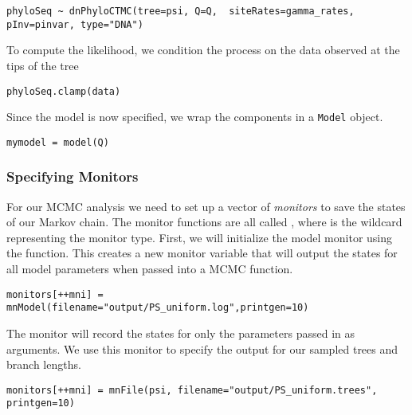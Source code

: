 {\tt \begin{snugshade*}
\begin{lstlisting}
phyloSeq ~ dnPhyloCTMC(tree=psi, Q=Q,  siteRates=gamma_rates, pInv=pinvar, type="DNA")
\end{lstlisting}
\end{snugshade*}}

To compute the likelihood, we condition the process on the data observed at the tips of the tree

{\tt \begin{snugshade*}
\begin{lstlisting}
phyloSeq.clamp(data)
\end{lstlisting}
\end{snugshade*}}

Since the model is now specified, we wrap the components in a {\tt Model} object.

{\tt \begin{snugshade*}
\begin{lstlisting}
mymodel = model(Q)
\end{lstlisting}
\end{snugshade*}}


\subsubsection{Specifying Monitors}

For our MCMC analysis we need to set up a vector of \textit{monitors} to save the states of our Markov chain. 
The monitor functions are all called , where \cl{*} is the wildcard representing the monitor type.
First, we will initialize the model monitor using the  function. This creates a new monitor variable that will output the states for all model parameters when passed into a MCMC function. 
{\tt \begin{snugshade*}
\begin{lstlisting}
monitors[++mni] = mnModel(filename="output/PS_uniform.log",printgen=10)
\end{lstlisting}
\end{snugshade*}}

The  monitor will record the states for only the parameters passed in as arguments. We use this monitor to specify the output for our sampled trees and branch lengths.

{\tt \begin{snugshade*}
\begin{lstlisting}
monitors[++mni] = mnFile(psi, filename="output/PS_uniform.trees", printgen=10)
\end{lstlisting}
\end{snugshade*}}

